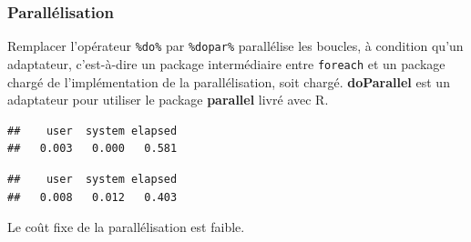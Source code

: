 \documentclass[
  12pt,
  french,
  a4paper,
  extrafontsizes,onecolumn,openright
  ]{memoir}
\newenvironment{Shaded}{\begin{snugshade}}{\end{snugshade}}
\newcommand{\CommentTok}[1]{\textcolor[rgb]{0.56,0.35,0.01}{\textit{#1}}}
\newcommand{\DataTypeTok}[1]{\textcolor[rgb]{0.13,0.29,0.53}{#1}}
\newcommand{\KeywordTok}[1]{\textcolor[rgb]{0.13,0.29,0.53}{\textbf{#1}}}
\newcommand{\NormalTok}[1]{#1}
\newcommand{\OperatorTok}[1]{\textcolor[rgb]{0.81,0.36,0.00}{\textbf{#1}}}
\newcommand{\StringTok}[1]{\textcolor[rgb]{0.31,0.60,0.02}{#1}}
\begin{document}
\hypertarget{paralluxe9lisation}{%
\subsubsection{Parallélisation}\label{paralluxe9lisation}}

Remplacer l'opérateur \texttt{\%do\%} par \texttt{\%dopar\%} parallélise les boucles, à condition qu'un adaptateur, c'est-à-dire un package intermédiaire entre \texttt{foreach} et un package chargé de l'implémentation de la parallélisation, soit chargé.
\textbf{doParallel} est un adaptateur pour utiliser le package \textbf{parallel} livré avec R.

\scriptsize

\begin{Shaded}
\end{Shaded}

\begin{verbatim}
##    user  system elapsed 
##   0.003   0.000   0.581
\end{verbatim}

\begin{Shaded}
\end{Shaded}

\begin{verbatim}
##    user  system elapsed 
##   0.008   0.012   0.403
\end{verbatim}

\normalsize

Le coût fixe de la parallélisation est faible.
\end{document}
